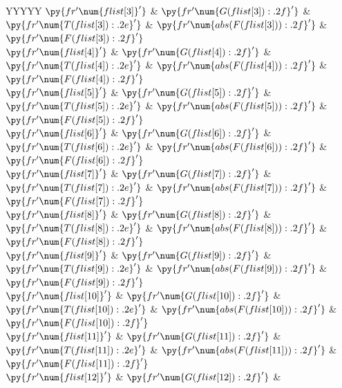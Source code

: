 \documentclass[../main/main.tex]{subfiles}
\begin{document}
{\begin{center}
\begin{tabularx}{\linewidth}{YYYYY}
			$\py{fr'\num{{{flist[3]}}}'}$              &
			$\py{fr'\num{{{G(flist[3]):.2f}}}'}$       &
			$\py{fr'\num{{{T(flist[3]):.2e}}}'}$       &
			$\py{fr'\num{{{abs(F(flist[3])):.2f}}}'}$  &
			$\py{fr'\num{{{F(flist[3]):.2f}}}'}$
			\\
			$\py{fr'\num{{{flist[4]}}}'}$              &
			$\py{fr'\num{{{G(flist[4]):.2f}}}'}$       &
			$\py{fr'\num{{{T(flist[4]):.2e}}}'}$       &
			$\py{fr'\num{{{abs(F(flist[4])):.2f}}}'}$  &
			$\py{fr'\num{{{F(flist[4]):.2f}}}'}$
			\\
			$\py{fr'\num{{{flist[5]}}}'}$              &
			$\py{fr'\num{{{G(flist[5]):.2f}}}'}$       &
			$\py{fr'\num{{{T(flist[5]):.2e}}}'}$       &
			$\py{fr'\num{{{abs(F(flist[5])):.2f}}}'}$  &
			$\py{fr'\num{{{F(flist[5]):.2f}}}'}$
			\\
			$\py{fr'\num{{{flist[6]}}}'}$              &
			$\py{fr'\num{{{G(flist[6]):.2f}}}'}$       &
			$\py{fr'\num{{{T(flist[6]):.2e}}}'}$       &
			$\py{fr'\num{{{abs(F(flist[6])):.2f}}}'}$  &
			$\py{fr'\num{{{F(flist[6]):.2f}}}'}$
			\\
			$\py{fr'\num{{{flist[7]}}}'}$              &
			$\py{fr'\num{{{G(flist[7]):.2f}}}'}$       &
			$\py{fr'\num{{{T(flist[7]):.2e}}}'}$       &
			$\py{fr'\num{{{abs(F(flist[7])):.2f}}}'}$  &
			$\py{fr'\num{{{F(flist[7]):.2f}}}'}$
			\\
			$\py{fr'\num{{{flist[8]}}}'}$              &
			$\py{fr'\num{{{G(flist[8]):.2f}}}'}$       &
			$\py{fr'\num{{{T(flist[8]):.2e}}}'}$       &
			$\py{fr'\num{{{abs(F(flist[8])):.2f}}}'}$  &
			$\py{fr'\num{{{F(flist[8]):.2f}}}'}$
			\\
			$\py{fr'\num{{{flist[9]}}}'}$              &
			$\py{fr'\num{{{G(flist[9]):.2f}}}'}$       &
			$\py{fr'\num{{{T(flist[9]):.2e}}}'}$       &
			$\py{fr'\num{{{abs(F(flist[9])):.2f}}}'}$  &
			$\py{fr'\num{{{F(flist[9]):.2f}}}'}$
			\\
			$\py{fr'\num{{{flist[10]}}}'}$             &
			$\py{fr'\num{{{G(flist[10]):.2f}}}'}$      &
			$\py{fr'\num{{{T(flist[10]):.2e}}}'}$      &
			$\py{fr'\num{{{abs(F(flist[10])):.2f}}}'}$ &
			$\py{fr'\num{{{F(flist[10]):.2f}}}'}$
			\\
			$\py{fr'\num{{{flist[11]}}}'}$             &
			$\py{fr'\num{{{G(flist[11]):.2f}}}'}$      &
			$\py{fr'\num{{{T(flist[11]):.2e}}}'}$      &
			$\py{fr'\num{{{abs(F(flist[11])):.2f}}}'}$ &
			$\py{fr'\num{{{F(flist[11]):.2f}}}'}$
			\\
			$\py{fr'\num{{{flist[12]}}}'}$             &
			$\py{fr'\num{{{G(flist[12]):.2f}}}'}$      &

\end{tabularx}
\end{center}}
\end{document}

